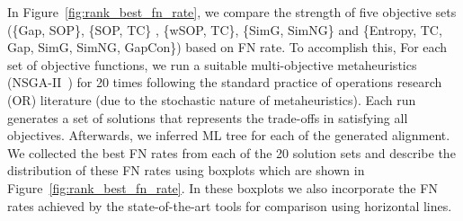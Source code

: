 In Figure~\ref{fig:rank_best_fn_rate}, we compare the strength of five objective sets (\{Gap, SOP\}, \{SOP, TC\} , \{wSOP, TC\}, \{SimG, SimNG\} and \{Entropy, TC, Gap, SimG, SimNG, GapCon\}) based on FN rate. To accomplish this, For each set of objective functions, we run a suitable multi-objective metaheuristics (NSGA-II~\citep{deb2002fast}) for 20 times following the standard practice of operations research (OR) literature (due to the stochastic nature of metaheuristics). Each run generates a set of solutions that represents the trade-offs in satisfying all objectives. Afterwards, we inferred ML tree for each of the generated alignment. We collected the best FN rates from each of the 20 solution sets and describe the distribution of these FN rates using boxplots which are shown in Figure~\ref{fig:rank_best_fn_rate}. In these boxplots we also incorporate the FN rates achieved by the state-of-the-art tools for comparison using horizontal lines.
 
 

